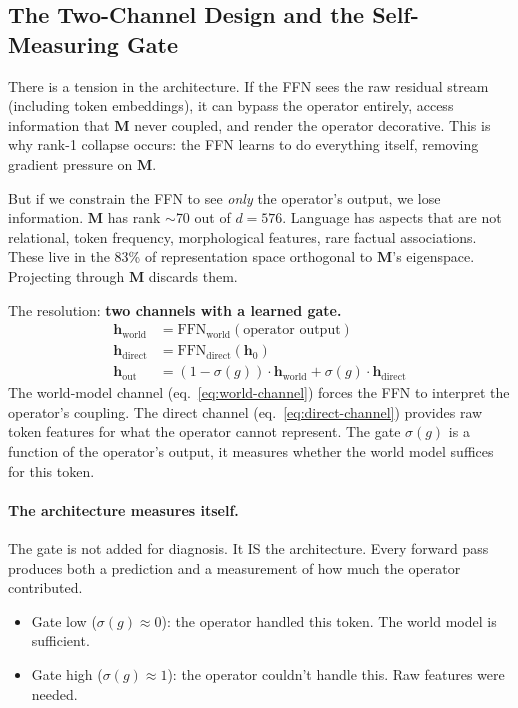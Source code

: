 \documentclass[11pt, a4paper]{article}
\newcommand{\M}{\mathbf{M}}
\newcommand{\h}{\mathbf{h}}
\theoremstyle{plain}
\theoremstyle{definition}
\theoremstyle{remark}
\begin{document}
\subsection{The Two-Channel Design and the Self-Measuring Gate}
\label{sec:two-channel}

There is a tension in the architecture.
If the FFN sees the raw residual stream (including token embeddings), it can bypass the operator entirely, access information that $\M$ never coupled, and render the operator decorative.
This is why rank-1 collapse occurs: the FFN learns to do everything itself, removing gradient pressure on $\M$.

But if we constrain the FFN to see \emph{only} the operator's output, we lose information.
$\M$ has rank $\sim$70 out of $d = 576$.
Language has aspects that are not relational, token frequency, morphological features, rare factual associations.
These live in the 83\% of representation space orthogonal to $\M$'s eigenspace.
Projecting through $\M$ discards them.

The resolution: \textbf{two channels with a learned gate.}
\begin{align}
\h_{\mathrm{world}} &= \mathrm{FFN}_{\mathrm{world}}(\text{operator output}) \label{eq:world-channel} \\
\h_{\mathrm{direct}} &= \mathrm{FFN}_{\mathrm{direct}}(\h_0) \label{eq:direct-channel} \\
\h_{\mathrm{out}} &= (1 - \sigma(g)) \cdot \h_{\mathrm{world}} + \sigma(g) \cdot \h_{\mathrm{direct}} \label{eq:gate}
\end{align}
The world-model channel (eq.~\ref{eq:world-channel}) forces the FFN to interpret the operator's coupling.
The direct channel (eq.~\ref{eq:direct-channel}) provides raw token features for what the operator cannot represent.
The gate $\sigma(g)$ is a function of the operator's output, it measures whether the world model suffices for this token.

\paragraph{The architecture measures itself.}
The gate is not added for diagnosis.
It IS the architecture.
Every forward pass produces both a prediction and a measurement of how much the operator contributed.
\begin{itemize}[nosep]
\item Gate low ($\sigma(g) \approx 0$): the operator handled this token. The world model is sufficient.
\item Gate high ($\sigma(g) \approx 1$): the operator couldn't handle this. Raw features were needed.
\end{itemize}
\end{document}

